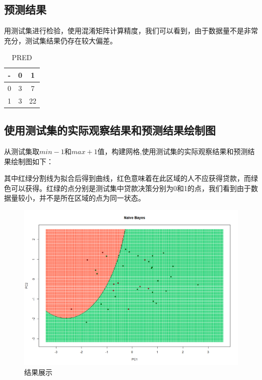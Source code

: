 \documentclass[UTF8]{ctexart}
\begin{document}
\subsection{预测结果}
用测试集进行检验，使用混淆矩阵计算精度，我们可以看到，由于数据量不是非常充分，测试集结果仍存在较大偏差。

\begin{table}[h!]
	\centering
	\caption{PRED}
	\vspace{0.3cm}
	\begin{tabular}{ccc}
		\toprule[1.5pt]
		- & 0 & 1  \\
		\midrule[1pt]
		0  & 3   & 7  \\
		1  & 3   & 22 \\
		\bottomrule[1.5pt]
	\end{tabular}%
	\label{tab:a111}%
\end{table}%

\subsection{使用测试集的实际观察结果和预测结果绘制图}
从测试集取$min-1$和$max+1$值，构建网格,使用测试集的实际观察结果和预测结果绘制图如下：

其中红绿分割线为拟合后得到曲线，红色意味着在此区域的人不应获得贷款，而绿色可以获得。红绿的点分别是测试集中贷款决策分别为0和1的点，我们看到由于数据量较小，并不是所在区域的点为同一状态。
\begin{figure}[t!]
	\centering
	\includegraphics[width=0.8\linewidth]{Rplot.png}
	\caption{结果展示}
\end{figure}
\end{document}
